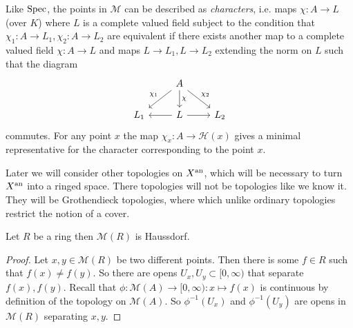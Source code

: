Like $\operatorname{Spec}$, the points in $\mathcal{M} $ can be described as \emph{characters}, i.e.  maps $\chi: A \to L$ (over $K$) where $L$ is a complete valued field subject to the condition that $\chi_1: A \to L_1, \chi_2: A \to L_2$ are equivalent if there exists another map to a complete valued field $\chi: A \to L$  and maps $L \to L_1, L \to L_2$ extending the norm on $L$ such that the diagram 
\[
\begin{tikzcd}
	& A \ar{dl}[']{\chi_1} \ar{dr}{\chi_2} \dar{\chi} \\
	L_1 & L \lar \rar & L_2
\end{tikzcd}
\] 
commutes. 
For any point $x$ the map $\chi_x: A \to \mathcal{H} (x)$ gives a minimal representative for the character corresponding to the point $x$. 


\begin{remark}
	Later we will consider other topologies on $X{}^{\text{an}}$, which will be necessary to turn $X{}^{\text{an}} $ into a ringed space. 
	There topologies will not be topologies like we know it. They will be Grothendieck topologies, where which unlike ordinary topologies restrict the notion of a cover. 
\end{remark}

\begin{proposition}
	Let $R$ be a ring then $\mathcal{M} (R)$ is Haussdorf. 
\end{proposition}
\begin{proof}
	Let $x, y \in \mathcal{M} (R)$ be two different points. 
	Then there is some $f \in R$ such that $f(x) \ne f(y)$. 
	So there are opens $U_x, U_y \subset  [0, \infty)$ that separate $f(x), f(y)$.
	Recall that $\phi: \mathcal{M} (A) \to [0, \infty): x \mapsto f(x)$ is continuous by definition of the topology on $\mathcal{M} (A)$. 
	So $\phi^{-1}(U_x)$ and $\phi^{-1}(U_y)$ are opens in $\mathcal{M} (R)$ separating $x,y$. 
\end{proof}



